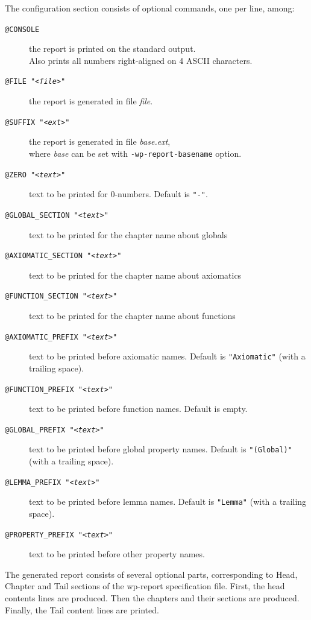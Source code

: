 The configuration section consists of optional commands, one per line,
among:
\begin{description}
\item[\tt @CONSOLE] the report is printed on the standard output. \\
  Also prints all numbers right-aligned on 4 ASCII characters.
\item[\tt @FILE "<\textit{file}>"] the report is generated in file \textit{file}.
\item[\tt @SUFFIX "<\textit{ext}>"] the report is generated in file \textit{base.ext},\\
  where \textit{base} can be set with \texttt{-wp-report-basename} option.
\item[\tt @ZERO "<\textit{text}>"] text to be printed for $0$-numbers. Default is \verb+"-"+.

\item[\tt @GLOBAL\_SECTION "<\textit{text}>"] text to be printed for the chapter name about globals
\item[\tt @AXIOMATIC\_SECTION "<\textit{text}>"] text to be printed for the chapter name about axiomatics
\item[\tt @FUNCTION\_SECTION "<\textit{text}>"] text to be printed for the chapter name about functions

\item[\tt @AXIOMATIC\_PREFIX "<\textit{text}>"] text to be printed before axiomatic names.
  Default is \verb+"Axiomatic"+ (with a trailing space).
\item[\tt @FUNCTION\_PREFIX "<\textit{text}>"] text to be printed before function names. Default is empty.
\item[\tt @GLOBAL\_PREFIX "<\textit{text}>"] text to be printed before global property names.
  Default is \verb+"(Global)"+ (with a trailing space).
\item[\tt @LEMMA\_PREFIX "<\textit{text}>"] text to be printed before lemma names.
  Default is \verb+"Lemma"+ (with a trailing space).
\item[\tt @PROPERTY\_PREFIX "<\textit{text}>"] text to be printed before other property names.
\end{description}

The generated report consists of several optional parts, corresponding
to Head, Chapter and Tail sections of the wp-report specification file.
First, the head contents lines are produced.
Then the chapters and their sections are produced.
Finally, the Tail content lines are printed.

